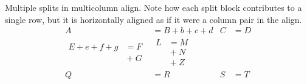 \documentclass[a4paper]{book}
\begin{document}
Multiple splits in multicolumn align.
Note how each split block contributes to a single row, but it is
horizontally aligned as if it were a column pair in the align.
\begin{align}
  A &= B+b+c+d &
  C &= D \\
\begin{split}
  E+e+f+g &= F \\
    &{} + G
\end{split} &
\begin{split}
    L &= M\\
    &{}+N \\
    &{}+Z
  \end{split} \\
  Q &= R &
  S &= T
\end{align}

\end{document}
